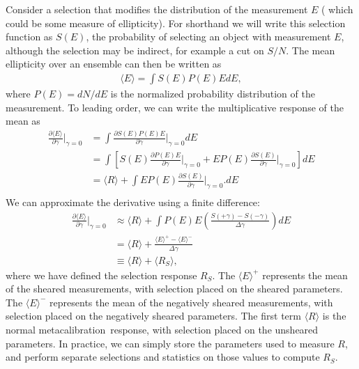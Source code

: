 \documentclass[usegraphicx,usenatbib]{mn2e}
\newcommand{\snr}{$S/N$}
\newcommand{\mcal}{metacalibration}
\newcommand{\mcalR}{$R$}
\newcommand{\mcalRS}{$R_{S}$}
\begin{document}
Consider a selection that modifies the distribution of the measurement $E$ (
which could be some measure of ellipticity). For shorthand we will write this
selection function as $S(E)$, the probability of selecting an object with
measurement $E$, although the selection may be indirect, for
example a cut on \snr.  The mean ellipticity over an ensemble can then
be written as 
\begin{align}
    \langle E \rangle = \int S(E) P(E) E dE,
\end{align}
where $P(E) = d N / d E$ is the normalized probability
distribution of the measurement.
To leading order, we can write the multiplicative response of the mean as
\begin{align}
    \frac{\partial \langle E \rangle}{\partial \gamma}\bigg|_{\gamma=0} 
    &= \int \frac{\partial S(E) P(E) E  }{\partial \gamma}\bigg|_{\gamma=0} dE \nonumber \\
    &= \int \left[ S(E) \frac{\partial  P(E) E  }{\partial \gamma}\bigg|_{\gamma=0} + E P(E) \frac{\partial S(E)}{\partial \gamma}\bigg|_{\gamma=0} \right] dE \nonumber \\
    &= \langle R \rangle + \int E P(E) \frac{\partial S(E)}{\partial \gamma}\bigg|_{\gamma=0}. dE \nonumber \\
\end{align}
We can approximate the derivative using a finite difference:
\begin{align}
    \frac{\partial \langle E \rangle}{\partial \gamma}\bigg|_{\gamma=0} &\approx
                      \langle R \rangle + \int P(E) E \left( \frac{S(+\gamma) - S(-\gamma)}{\Delta \gamma}\right) dE  \nonumber \\
                      &= \langle R \rangle + \frac{\langle E \rangle^+ - \langle E \rangle^-}{\Delta \gamma} \nonumber \\
                      &\equiv \langle R \rangle + \langle \mbox{\mcalRS} \rangle,
\end{align}
where we have defined the selection response \mcalRS. The $\langle E \rangle^+$
represents the mean of the sheared measurements, with selection placed on the sheared parameters. The $\langle E
\rangle^-$ represents the mean of the negatively sheared measurements,
with selection placed on the negatively sheared
parameters.  The
first term $\langle R \rangle$ is the normal \mcal\ response, with
selection placed on the unsheared parameters.  In practice, we can simply store the parameters used to
measure \mcalR, and perform separate selections and statistics on those values
to compute \mcalRS.
\end{document}
